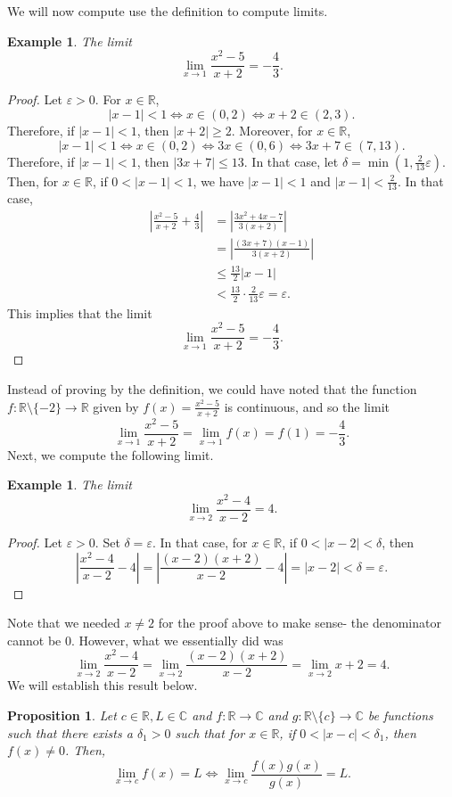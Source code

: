 \documentclass[a4paper, openany]{memoir}
\theoremstyle{definition}
\theoremstyle{plain}
\newtheorem{proposition}[definition]{Proposition}
\newtheorem{example}[definition]{Example}
\begin{document}
We will now compute use the definition to compute limits.
\begin{example}
The limit
\[\lim_{x \to 1} \frac{x^2 - 5}{x + 2} = -\frac{4}{3}.\]
\end{example}
\begin{proof}
Let $\varepsilon > 0$. For $x \in \mathbb{R}$,
\[|x - 1| < 1 \iff x \in (0, 2) \iff x + 2 \in (2, 3).\]
Therefore, if $|x-1| < 1$, then $|x+2| \geqslant 2$. Moreover, for $x \in \mathbb{R}$,
\[|x - 1| < 1 \iff x \in (0, 2) \iff 3x \in (0, 6) \iff 3x + 7 \in (7, 13).\]
Therefore, if $|x-1| < 1$, then $|3x+7| \leqslant 13$. In that case, let $\delta = \min(1, \frac{2}{13} \varepsilon)$. Then, for $x \in \mathbb{R}$, if $0 < |x-1| < 1$, we have $|x-1| < 1$ and $|x-1| < \frac{2}{13}$. In that case,
\begin{align*}
    \left|\frac{x^2 - 5}{x + 2} + \frac{4}{3}\right| &= \left|\frac{3x^2 + 4x - 7}{3(x+2)}\right| \\
    &= \left|\frac{(3x+7)(x-1)}{3(x+2)}\right| \\
    &\leqslant \frac{13}{2} |x - 1| \\
    &< \frac{13}{2} \cdot \frac{2}{13} \varepsilon = \varepsilon.
\end{align*}
This implies that the limit
\[\lim_{x \to 1} \frac{x^2 - 5}{x + 2} = -\frac{4}{3}.\]
\end{proof}
\noindent Instead of proving by the definition, we could have noted that the function $f: \mathbb{R} \setminus \{-2\} \to \mathbb{R}$ given by $f(x) = \frac{x^2 - 5}{x + 2}$ is continuous, and so the limit
\[\lim_{x \to 1} \frac{x^2 - 5}{x + 2} = \lim_{x \to 1} f(x) = f(1) = -\frac{4}{3}.\]
\noindent Next, we compute the following limit.
\begin{example}
The limit
\[\lim_{x \to 2} \frac{x^2 - 4}{x - 2} = 4.\]
\end{example}
\begin{proof}
Let $\varepsilon > 0$. Set $\delta = \varepsilon$. In that case, for $x \in \mathbb{R}$, if $0 < |x - 2| < \delta$, then
\[\left|\frac{x^2 - 4}{x - 2} - 4\right| = \left|\frac{(x - 2)(x + 2)}{x - 2} - 4\right| = \left|x - 2\right| < \delta = \varepsilon.\]
\end{proof}
\noindent Note that we needed $x \neq 2$ for the proof above to make sense- the denominator cannot be 0. However, what we essentially did was
\[\lim_{x \to 2} \frac{x^2 - 4}{x - 2} = \lim_{x \to 2} \frac{(x - 2)(x + 2)}{x - 2} = \lim_{x \to 2} x + 2 = 4.\]
We will establish this result below.
\begin{proposition}
Let $c \in \mathbb{R}, L \in \mathbb{C}$ and $f: \mathbb{R} \to \mathbb{C}$ and $g: \mathbb{R} \setminus \{c\} \to \mathbb{C}$ be functions such that there exists a $\delta_1 > 0$ such that for $x \in \mathbb{R}$, if $0 < |x - c| < \delta_1$, then $f(x) \neq 0$. Then, 
\[\lim_{x \to c} f(x) = L \iff \lim_{x \to c} \frac{f(x) g(x)}{g(x)} = L.\]
\end{proposition}
\end{document}
